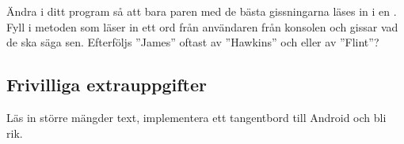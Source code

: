 \Subtask Ändra i ditt program så att bara paren med de bästa gissningarna läses in i en . Fyll i metoden  som läser in ett ord från användaren från konsolen och gissar vad de ska säga sen. Efterföljs ''James'' oftast av ''Hawkins'' och eller av ''Flint''?




\subsection{Frivilliga extrauppgifter}

\Task Läs in större mängder text, implementera ett tangentbord till Android och bli rik.


    